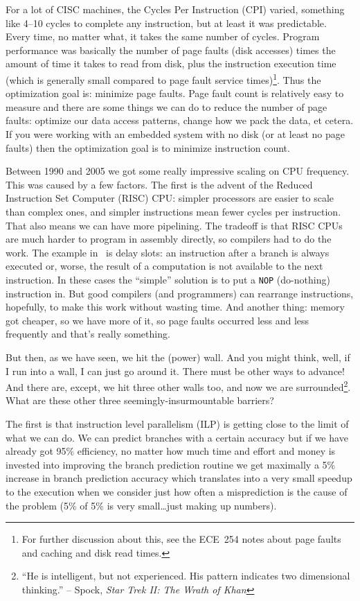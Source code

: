 For a lot of CISC machines, the Cycles Per Instruction (CPI) varied, something like 4--10 cycles to complete any instruction, but at least it was predictable. Every time, no matter what, it takes the same number of cycles. Program performance was basically the number of page faults (disk accesses) times the amount of time it takes to read from disk, plus the instruction execution time (which is generally small compared to page fault service times)\footnote{For further discussion about this, see the ECE~254 notes about page faults and caching and disk read times.}. Thus the optimization goal is: minimize page faults. Page fault count is relatively easy to measure and there are some things we can do to reduce the number of page faults: optimize our data access patterns, change how we pack the data, et cetera. If you were working with an embedded system with no disk (or at least no page faults) then the optimization goal is to minimize instruction count.

Between 1990 and 2005 we got some really impressive scaling on CPU frequency. This was caused by a few factors. The first is the advent of the Reduced Instruction Set Computer (RISC) CPU: simpler processors are easier to scale than complex ones, and simpler instructions mean fewer cycles per instruction. That also means we can have more pipelining. The tradeoff is that RISC CPUs are much harder to program in assembly directly, so compilers had to do the work. The example in~\cite{modern-hardware} is delay slots: an instruction after a branch is always executed or, worse, the result of a computation is not available to the next instruction. In these cases the ``simple'' solution is to put a \texttt{NOP} (do-nothing) instruction in. But good compilers (and programmers) can rearrange instructions, hopefully, to make this work without wasting time. And another thing: memory got cheaper, so we have more of it, so page faults occurred less and less frequently and that's really something.

But then, as we have seen, we hit the (power) wall. And you might think, well, if I run into a wall, I can just go around it. There must be other ways to advance! And there are, except, we hit three other walls too, and now we are surrounded\footnote{``He is intelligent, but not experienced. His pattern indicates two dimensional thinking.'' -- Spock, \textit{Star Trek II: The Wrath of Khan}}. What are these other three seemingly-insurmountable barriers?

The first is that instruction level parallelism (ILP) is getting close to the limit of what we can do. We can predict branches with a certain accuracy but if we have already got 95\% efficiency, no matter how much time and effort and money is invested into improving the branch prediction routine we get maximally a 5\% increase in branch prediction accuracy which translates into a very small speedup to the execution when we consider just how often a misprediction is the cause of the problem (5\% of 5\% is very small\ldots just making up numbers).


